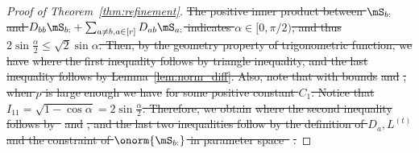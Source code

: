 \documentclass[lettersize,onecolumn,journal]{IEEEtran}
\theoremstyle{definition}
\theoremstyle{definition}
\newcommand{\offf}[1]{\left\{#1\right\}}
\providecommand{\DIFdeltex}[1]{{\protect\color{red}\sout{#1}}}                      %
\providecommand{\DIFdel}[1]{\texorpdfstring{\DIFdeltex{#1}}{}} %
\begin{document}
\begin{proof}[Proof of Theorem~\ref{thm:refinement}]
\DIFdel{The positive inner product between $\mS_{b:}$ and $D_{bb} \mS_{b:} + \sum_{a \neq b, a \in [r]} D_{ab} \mS_{a:}$ indicates $\alpha \in [0,  \pi/2)$, and thus $2\sin \frac{\alpha}{2} \leq \sqrt{2} \sin \alpha$. Then, by the geometry property of trigonometric function, we have 
    }%
\DIFdel{where the first inequality follows by triangle inequality, and the last inequality follows by Lemma~\ref{lem:norm_diff}. Also, note that with bounds }%
\DIFdel{and }%
\DIFdel{, when $p$ is large enough we have 
    }%
\DIFdel{for some positive constant $C_1$. Notice that $I_{11} = \sqrt{1 - \cos \alpha} = 2 \sin \frac{\alpha}{2}$. Therefore, we obtain
    }%
\DIFdel{where the second inequality follows by~}%
\DIFdel{and }%
\DIFdel{, and the last two inequalities follow by the definition of $D_a, L^{(t)}$ and the constraint of $\onorm{\mS_{b:}}$ in parameter space~}%
\DIFdel{.
    }%


\end{proof}
\end{document}
